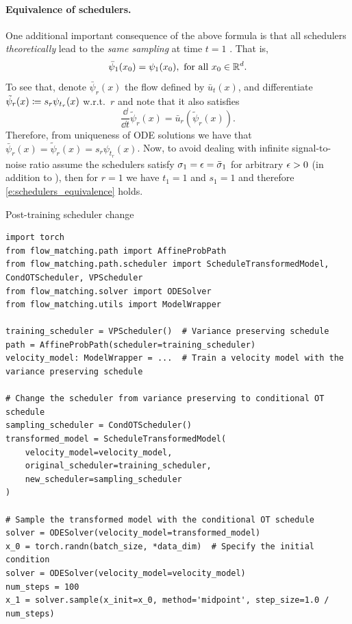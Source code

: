 \documentclass{fairmeta}
\renewcommand{\eqref}[1]{\labelcref{#1}}
\numberwithin{equation}{section}
\begin{document}
\paragraph{Equivalence of schedulers.} One additional important consequence of the above formula is that all schedulers \emph{theoretically} lead to the \emph{same sampling} at time $t=1$ \citep{shaul2023kinetic}. That is,  
\begin{equation}\label{e:schedulers_equivalence}
 \bar{\psi}_1(x_0)=\psi_1(x_0), \text{ for all } x_0\in \mathbb R^d.    
\end{equation}
To see that, denote $\bar{\psi}_r(x)$ the flow defined by $\bar{u}_t(x)$, and  differentiate $\tilde{\psi}_r(x) \coloneqq s_r\psi_{t_r}(x)$ w.r.t.~$r$ and note that it also satisfies 
\begin{equation}
    \frac{\dd }{\dd t} \tilde{\psi}_r(x) = \bar{u}_r(\tilde{\psi}_r(x)). 
\end{equation}
Therefore, from uniqueness of ODE solutions we have that $\bar{\psi}_r(x)=\tilde{\psi}_r(x)=s_r\psi_{t_r}(x)$. Now, to avoid dealing with infinite signal-to-noise ratio assume the schedulers satisfy $\sigma_1={\epsilon}=\bar{\sigma}_1$ for arbitrary ${\epsilon}>0$ (in addition to \eqref{e:scheduler}), then for $r=1$ we have $t_1=1$ and $s_1=1$ and therefore \cref{e:schedulers_equivalence} holds. 
\begin{pbox}[label={ex:fm_scheduler}]{Post-training scheduler change}
\begin{verbatim}
import torch
from flow_matching.path import AffineProbPath
from flow_matching.path.scheduler import ScheduleTransformedModel, CondOTScheduler, VPScheduler
from flow_matching.solver import ODESolver
from flow_matching.utils import ModelWrapper

training_scheduler = VPScheduler()  # Variance preserving schedule
path = AffineProbPath(scheduler=training_scheduler)
velocity_model: ModelWrapper = ...  # Train a velocity model with the variance preserving schedule

# Change the scheduler from variance preserving to conditional OT schedule
sampling_scheduler = CondOTScheduler()
transformed_model = ScheduleTransformedModel(
    velocity_model=velocity_model,
    original_scheduler=training_scheduler,
    new_scheduler=sampling_scheduler
)

# Sample the transformed model with the conditional OT schedule
solver = ODESolver(velocity_model=transformed_model)
x_0 = torch.randn(batch_size, *data_dim)  # Specify the initial condition
solver = ODESolver(velocity_model=velocity_model)
num_steps = 100
x_1 = solver.sample(x_init=x_0, method='midpoint', step_size=1.0 / num_steps)
\end{verbatim}
\end{pbox}
\end{document}
